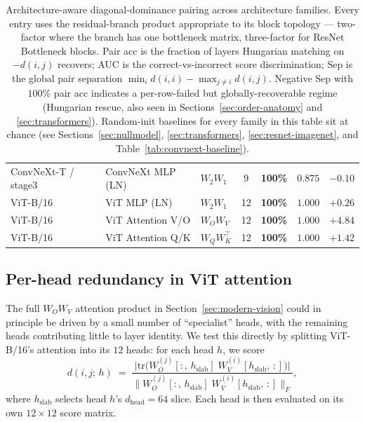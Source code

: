 \documentclass[10pt]{article}
\theoremstyle{remark}
\begin{document}
\begin{table}[H]
\begin{tabular}{lllcccc}
\midrule
ConvNeXt-T / stage3        & ConvNeXt MLP (LN)   & $W_2 W_1$                          &  9 & \textbf{100\%} & $0.875$ & $-0.10$ \\
ViT-B/16                   & ViT MLP (LN)        & $W_2 W_1$                          & 12 & \textbf{100\%} & $1.000$ & $+0.26$ \\
ViT-B/16                   & ViT Attention V/O   & $W_O W_V$                          & 12 & \textbf{100\%} & $1.000$ & $+4.84$ \\
ViT-B/16                   & ViT Attention Q/K   & $W_Q W_K^\top$                     & 12 & \textbf{100\%} & $1.000$ & $+1.42$ \\
\bottomrule
\end{tabular}
\caption{Architecture-aware diagonal-dominance pairing across architecture
families. Every entry uses the residual-branch product appropriate to
its block topology --- two-factor where the branch has one bottleneck
matrix, three-factor for ResNet Bottleneck blocks. Pair acc is the
fraction of layers Hungarian matching on $-d(i,j)$ recovers; AUC is the
correct-vs-incorrect score discrimination; Sep is the global pair
separation $\min_i d(i,i) - \max_{j \neq i} d(i,j)$. Negative Sep with
$100\%$ pair acc indicates a per-row-failed but globally-recoverable
regime (Hungarian rescue, also seen in Sections~\ref{sec:order-anatomy}
and \ref{sec:transformers}). Random-init baselines for every family in
this table sit at chance (see Sections~\ref{sec:nullmodel},
\ref{sec:transformers}, \ref{sec:resnet-imagenet}, and
Table~\ref{tab:convnext-baseline}).}\label{tab:archmaster}
\end{table}

\subsection{Per-head redundancy in ViT attention}\label{sec:vit-perhead}

The full $W_O W_V$ attention product in Section~\ref{sec:modern-vision}
could in principle be driven by a small number of ``specialist'' heads,
with the remaining heads contributing little to layer identity. We test
this directly by splitting ViT-B/16's attention into its $12$ heads:
for each head $h$, we score
\[
  d(i, j;\, h) \;=\; \frac{\bigl|\mathrm{tr}\bigl(W_O^{(j)}[:,\,h_{\mathrm{slab}}]\;
  W_V^{(i)}[h_{\mathrm{slab}},\,:]\bigr)\bigr|}
  {\bigl\|W_O^{(j)}[:,\,h_{\mathrm{slab}}]\;W_V^{(i)}[h_{\mathrm{slab}},\,:]\bigr\|_F},
\]
where $h_{\mathrm{slab}}$ selects head $h$'s $d_{\mathrm{head}}{=}64$
slice. Each head is then evaluated on its own $12\times 12$ score
matrix.
\end{document}
